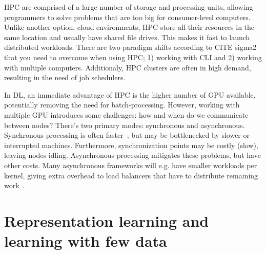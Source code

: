 \documentclass[10pt,twocolumn,letterpaper]{article}
\begin{document}
\gls{HPC} are comprised of a large number of storage and processing units, allowing programmers to solve problems that are too big for consumer-level computers. Unlike another option, cloud environments, \gls{HPC} store all their resources in the same location and usually have shared file drives. This makes it fast to launch distributed workloads. There are two paradigm shifts according to CITE sigma2 that you need to overcome when using \gls{HPC}; 1) working with \gls{CLI} and 2) working with multiple computers. Additionaly, \gls{HPC} clusters are often in high demand, resulting in the need of job schedulers. 

In \gls{DL}, an immediate advantage of \gls{HPC} is the higher number of \gls{GPU} available, potentially removing the need for batch-processing. However, working with multiple \gls{GPU} introduces some challenges: how and when do we communicate between nodes? There's two primary modes: synchronous and asynchronous. Synchronous processing is often faster~\cite{distributedDL}, but may be bottlenecked by slower or interrupted machines. Furthermore, synchronization points may be costly (slow), leaving nodes idling. Asynchronous processing mitigates these problems, but have other costs. Many asynchronous frameworks will e.g. have smaller workloads per kernel, giving extra overhead to load balancers that have to distribute remaining work~\cite{pan2017synchronous}.

\section{Representation learning and learning with few data}

\end{document}
